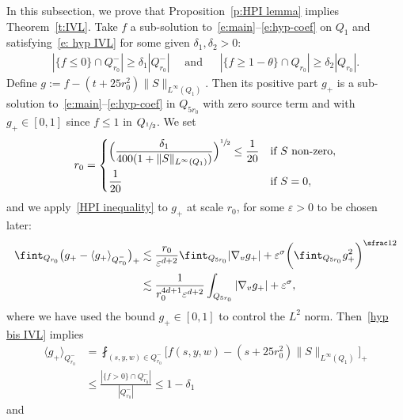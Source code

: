 \documentclass[10pt]{amsart}
\theoremstyle{definition}
\theoremstyle{remark}
\let\var\varepsilon
\begin{document}
In this subsection, we prove that Proposition~\ref{p:HPI lemma}
implies Theorem~\ref{t:IVL}. Take $f$ a sub-solution
to~\eqref{e:main}--\eqref{e:hyp-coef} on $Q_1$ and
satisfying~\eqref{e: hyp IVL} for some given
$\delta_1,\delta_2>0$:\vspace*{-3pt}
\begin{align}
\label{hyp bis IVL}
|\{f\leq 0\}\cap Q_{r_0}^{-}| \geq \delta_1 |Q_{r_0}^{-}|
\quad \text{ and }\ \quad
|\{f\geq 1-\theta\} \cap Q_{r_0}| \geq \delta_2 |Q_{r_0}|.
\end{align}
Define $g:=f-(t+25r_0^2) \|S\|_{L^\infty(Q_1)}$. Then its
positive part $g_+$ is a sub-solution
to~\eqref{e:main}--\eqref{e:hyp-coef} in $Q_{5r_0}$ with zero
source term and with $g_+ \in [0,1]$ since $f\le 1$ in
$Q_{\sfrac{1}{2}}$. We set\vspace*{-3pt}
\[
r_0 = \begin{dcases}
\Bigl(\dfrac{\delta_1}{400
(1+\|S\|_{L^\infty(Q_1)})}\Bigr)^{\sfrac12} \leq
\dfrac{1}{20}&\text{if $S$ non-zero},\\
\dfrac{1}{20}&\text{if $S=0$},
\end{dcases}
\]
and we apply~\eqref{HPI inequality} to $g_+$ at scale $r_0$, for
some $\var>0$ to be chosen later:\vspace*{-3pt}
\begin{equation}\label{Poinc in proof}
\begin{aligned}
\fint_{Q_{r_0}} \bigl(g_+-\langle
g_+\rangle_{Q_{r_0}^{-}}\bigr)_{+}
& \lesssim
\frac{r_0}{\varepsilon^{d+2}} \fint_{Q_{5r_0}} |\nabla_v g_+|
+ \var^\sigma \biggl( \fint_{Q_{5r_0}} g_+^2 \biggr)^{\sfrac12}\\
& \lesssim
\frac{1}{r_0^{4d+1} \varepsilon^{d+2}} \int_{Q_{5r_0}} |\nabla_v g_+|
+ \var^\sigma,
\end{aligned}
\end{equation}
where we have used the bound $g_+ \in [0,1]$ to control the $L^2$
norm. Then~\eqref{hyp bis IVL} implies\vspace*{-3pt}
\begin{equation}
\begin{aligned}
\label{estim averag}
\langle g_+\rangle_{Q_{r_0}^{-}} &= \fint_{(s,y,w) \in
Q_{r_0}^-} \big[f(s,y,w) - (s+25r_0^2) \| S \|_{L^\infty(Q_1)}\big]_+\\
&\leq \frac{\left|{\{f>0\}\cap Q_{r_0}^-}\right|}{|Q^{-}_{r_0}|}
\leq 1-\delta_1
\end{aligned}
\end{equation}
and\vspace*{-3pt}
\end{document}
